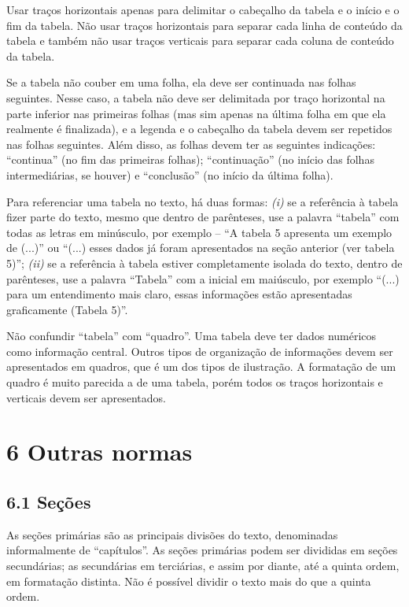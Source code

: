 \documentclass[
	12pt,				%
	oneside,			%
	a4paper,			%
	english,			%
	brazil				%
	]{abntex2ppgsi}
\begin{document}
\begin{anexosenv}
Usar traços horizontais apenas para delimitar o cabeçalho da tabela e o início e o fim da tabela. Não usar traços horizontais para separar cada linha de conteúdo da tabela e também não usar traços verticais para separar cada coluna de conteúdo da tabela. 

Se a tabela não couber em uma folha, ela deve ser continuada nas folhas seguintes. Nesse caso, a tabela não deve ser delimitada por traço horizontal na parte inferior nas primeiras folhas (mas sim apenas na última folha em que ela realmente é finalizada), e a legenda e o cabeçalho da tabela devem ser repetidos nas folhas seguintes. Além disso, as folhas devem ter as seguintes indicações: ``continua'' (no fim das primeiras folhas); ``continuação'' (no início das folhas intermediárias, se houver) e ``conclusão'' (no início da última folha).

Para referenciar uma tabela no texto, há duas formas: \textit{(i)} se a referência à tabela fizer parte do texto, mesmo que dentro de parênteses, use a palavra ``tabela'' com todas as letras em minúsculo, por exemplo – ``A tabela 5 apresenta um exemplo de (...)'' ou ``(...) esses dados já foram apresentados na seção anterior (ver tabela 5)''; \textit{(ii)} se a referência à tabela estiver completamente isolada do texto, dentro de parênteses, use a palavra ``Tabela'' com a inicial em maiúsculo, por exemplo ``(...) para um entendimento mais claro, essas informações estão apresentadas graficamente (Tabela 5)''.

Não confundir ``tabela'' com ``quadro''. Uma tabela deve ter dados numéricos como informação central. Outros tipos de organização de informações devem ser apresentados em quadros, que é um dos tipos de ilustração. A formatação de um quadro é muito parecida a de uma tabela, porém todos os traços horizontais e verticais devem ser apresentados.

\section*{6 Outras normas}

\subsection*{6.1 Seções}

As seções primárias são as principais divisões do texto, denominadas informalmente de ``capítulos''. As seções primárias podem ser divididas em seções secundárias; as secundárias em terciárias, e assim por diante, até a quinta ordem, em formatação distinta. Não é possível dividir o texto mais do que a quinta ordem.


\end{anexosenv}
\end{document}
